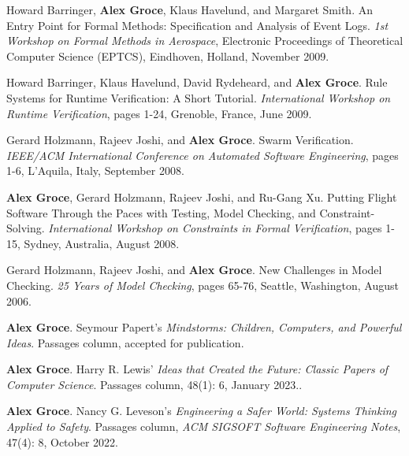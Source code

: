\documentclass[ComputerScience]{vita}
\begin{document}
\begin{vita}
\begin{Invited Papers}
\item Howard Barringer, {\bf Alex Groce}, Klaus Havelund, and Margaret Smith.
\newblock An Entry Point for Formal Methods:  Specification and Analysis of Event Logs.
\newblock \emph{1st Workshop on Formal Methods in Aerospace}, Electronic Proceedings of Theoretical Computer Science (EPTCS), Eindhoven, Holland, November 2009.

\item Howard Barringer, Klaus Havelund, David Rydeheard, and {\bf Alex Groce}.
\newblock Rule Systems for Runtime Verification: A Short Tutorial.
\newblock \emph{International Workshop on Runtime Verification}, pages 1-24, Grenoble, France, June 2009.

\item Gerard Holzmann, Rajeev Joshi, and {\bf Alex Groce}.
\newblock Swarm Verification.
\newblock \emph{IEEE/ACM International Conference on Automated Software Engineering}, pages 1-6, L'Aquila, Italy, September 2008.

\item {\bf Alex Groce}, Gerard Holzmann, Rajeev Joshi, and Ru-Gang Xu.
\newblock Putting Flight Software Through the Paces with Testing, Model Checking, and Constraint-Solving.
\newblock \emph{International Workshop on Constraints in Formal Verification}, pages 1-15, Sydney, Australia, August 2008.

\item
Gerard Holzmann, Rajeev Joshi, and {\bf Alex Groce}.
\newblock New Challenges in Model Checking.
\newblock \emph
{25 Years of Model Checking}, pages 65-76, Seattle, Washington, August 2006.
\end{Invited Papers}

\begin{Columns, Book Reviews, and Magazine Articles}
\item {\bf Alex Groce}. 
\newblock Seymour Papert's \emph{Mindstorms: Children, Computers, and Powerful Ideas}.
\newblock Passages column, accepted for publication.
  
\item {\bf Alex Groce}. 
\newblock Harry R. Lewis' \emph{Ideas that Created the Future: Classic Papers of Computer Science}.
\newblock Passages column, 48(1): 6, January 2023..
  
\item {\bf Alex Groce}. 
\newblock Nancy G. Leveson's \emph{Engineering a Safer World: Systems Thinking Applied to Safety}. 
\newblock Passages column, \emph{ACM SIGSOFT Software Engineering 
  Notes}, 47(4): 8, October 2022.
  

\end{Columns, Book Reviews, and Magazine Articles}
\end{vita}
\end{document}
